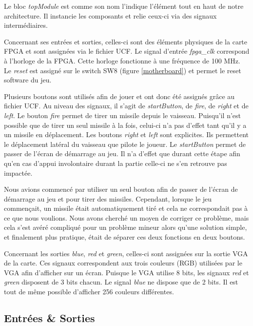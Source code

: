\documentclass[french]{nakrule}
\begin{document}
Le bloc \emph{topModule} est comme son nom l'indique l'élément tout en haut de notre architecture. Il instancie les composants et relie ceux-ci via des signaux intermédiaires. 

Concernant ses entrées et sorties, celles-ci sont des éléments physiques de la carte FPGA et sont assignées via le fichier UCF. Le signal d'entrée \emph{fpga\_clk} correspond à l’horloge de la FPGA. Cette horloge fonctionne à une fréquence de 100 MHz. Le \emph{reset} est assigné sur le switch SW8 (figure \ref{motherboard}) et permet le reset software du jeu.

Plusieurs boutons sont utilisés afin de jouer et ont donc été assignés grâce au fichier UCF. Au niveau des signaux, il s'agit de \emph{startButton}, de \emph{fire}, de \emph{right} et de \emph{left}. 
Le bouton \emph{fire} permet de tirer un missile depuis le vaisseau. Puisqu'il n'est possible que de tirer un seul missile à la fois, celui-ci n'a pas d'effet tant qu'il y a un missile en déplacement. 
Les boutons \emph{right} et \emph{left} sont explicites. Ils permettent le déplacement latéral du vaisseau que pilote le joueur.
Le \emph{startButton} permet de passer de l'écran de démarrage au jeu. Il n'a d'effet que durant cette étape afin qu'en cas d'appui involontaire durant la partie celle-ci ne s'en retrouve pas impactée.

Nous avions commencé par utiliser un seul bouton afin de passer de l'écran de démarrage au jeu et pour tirer des missiles. Cependant, lorsque le jeu commençait, un missile était automatiquement tiré et cela ne correspondait pas à ce que nous voulions. Nous avons cherché un moyen de corriger ce problème, mais cela s'est avéré compliqué pour un problème mineur alors qu'une solution simple, et finalement plus pratique, était de séparer ces deux fonctions en deux boutons.

Concernant les sorties \emph{blue}, \emph{red} et \emph{green}, celles-ci sont assignées sur la sortie VGA de la carte. Ces signaux correspondent aux trois couleurs (RGB) utilisées par le VGA afin d'afficher sur un écran. Puisque le VGA utilise 8 bits, les signaux \emph{red} et \emph{green} disposent de 3 bits chacun. Le signal \emph{blue} ne dispose que de 2 bits.
Il est tout de même possible d'afficher 256 couleurs différentes.

\subsection{Entrées \& Sorties}
\label{subsec:Entrees_Sorties_topModule}
\end{document}
